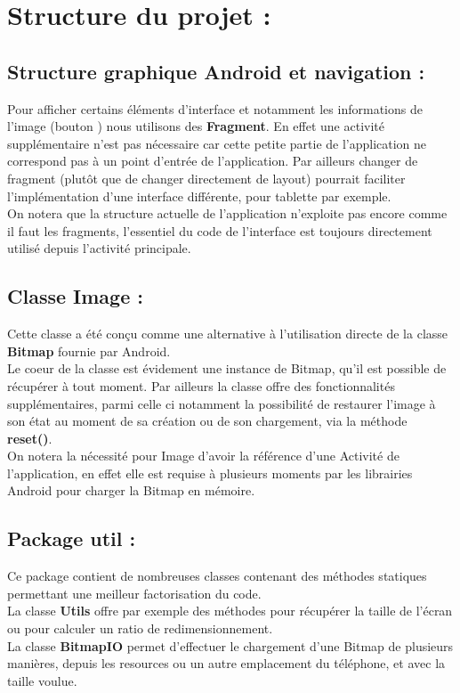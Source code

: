 \section{Structure du projet :}

\subsection{Structure graphique Android et navigation :}
Pour afficher certains éléments d'interface et notamment les informations de l'image (bouton \faInfoCircle) nous utilisons des \textbf{Fragment}. En effet une activité supplémentaire n'est pas nécessaire car cette petite partie de l'application ne correspond pas à un point d'entrée de l'application. Par ailleurs changer de fragment (plutôt que de changer directement de layout) pourrait faciliter l'implémentation d'une interface différente, pour tablette par exemple.
\\
On notera que la structure actuelle de l'application n'exploite pas encore comme il faut les fragments, l'essentiel du code de l'interface est toujours directement utilisé depuis l'activité principale.
\\

\subsection{Classe \textbf{Image} :} \label{classeImage}
Cette classe a été conçu comme une alternative à l'utilisation directe de la classe \textbf{Bitmap} fournie par Android.
\\
Le coeur de la classe est évidement une instance de Bitmap, qu'il est possible de récupérer à tout moment. Par ailleurs la classe offre des fonctionnalités supplémentaires, parmi celle ci notamment la possibilité de restaurer l'image à son état au moment de sa création ou de son chargement, via la méthode \textbf{reset()}.
\\
On notera la nécessité pour Image d'avoir la référence d'une Activité de l'application, en effet elle est requise à plusieurs moments par les librairies Android pour charger la Bitmap en mémoire.

\subsection{Package \textbf{util} :}
Ce package contient de nombreuses classes contenant des méthodes statiques permettant une meilleur factorisation du code.
\\
La classe \textbf{Utils} offre par exemple des méthodes pour récupérer la taille de l'écran ou pour calculer un ratio de redimensionnement.
\\
La classe \textbf{BitmapIO} permet d'effectuer le chargement d'une Bitmap de plusieurs manières, depuis les resources ou un autre emplacement du téléphone, et avec la taille voulue.
